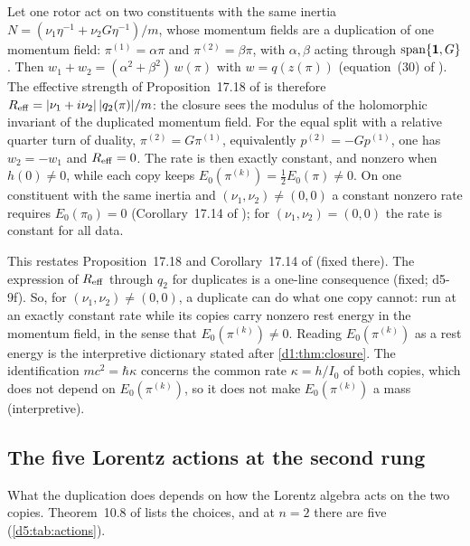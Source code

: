 \begin{proposition}
\label{d5:prop:balance}
Let one rotor act on two constituents with the same inertia $N=(\nu_1\eta^{-1}+\nu_2G\eta^{-1})/m$, whose momentum fields are a duplication of one
momentum field: $\pi^{(1)}=\alpha\pi$ and $\pi^{(2)}=\beta\pi$, with $\alpha,\beta$ acting through $\operatorname{span}\{\mathbf 1,G\}$. Then
$w_1+w_2=(\alpha^2+\beta^2)\,w(\pi)$ with $w=q(z(\pi))$ (equation~(30) of \cite{ES17}). The effective strength of Proposition~17.18 of \cite{ES17}
is therefore $R_{\rm eff}=|\nu_1+i\nu_2|\,|q_2(\pi)|/m$: the closure sees the modulus of the holomorphic invariant of the duplicated momentum field. For the equal
split with a relative quarter turn of duality, $\pi^{(2)}=G\pi^{(1)}$, equivalently $p^{(2)}=-Gp^{(1)}$, one has $w_2=-w_1$ and $R_{\rm eff}=0$. The
rate is then exactly constant, and nonzero when $h(0)\neq0$, while each copy keeps $E_0(\pi^{(k)})=\tfrac12E_0(\pi)\neq0$. On one constituent with
the same inertia and $(\nu_1,\nu_2)\neq(0,0)$ a constant nonzero rate requires $E_0(\pi_0)=0$ (Corollary~17.14 of \cite{ES17}); for
$(\nu_1,\nu_2)=(0,0)$ the rate is constant for all data.
\end{proposition}

This restates Proposition~17.18 and Corollary~17.14 of \cite{ES17} (fixed there). The expression of $R_{\rm eff}$ through $q_2$ for duplicates is a
one-line consequence (fixed; d5-9f). So, for $(\nu_1,\nu_2)\neq(0,0)$, a duplicate can do what one copy cannot: run at an exactly constant rate while its copies carry nonzero
rest energy in the momentum field, in the sense that $E_0(\pi^{(k)})\neq0$. Reading $E_0(\pi^{(k)})$ as a rest energy is the interpretive dictionary stated after \cref{d1:thm:closure}. The identification $mc^2=\hbar\kappa$ concerns the common rate $\kappa=h/I_0$ of both copies, which does not depend on $E_0(\pi^{(k)})$, so it does not make $E_0(\pi^{(k)})$ a mass (interpretive).

\subsection{The five Lorentz actions at the second rung}
\label{d5:sec:actions}

What the duplication does depends on how the Lorentz algebra acts on the two copies. Theorem~10.8 of \cite{ES17} lists the choices, and at $n=2$
there are five (\cref{d5:tab:actions}).

